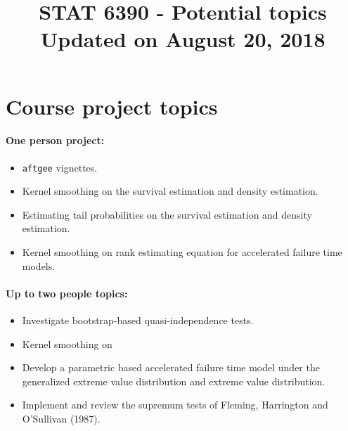 \documentclass[a4paper,10pt]{article}
\title{STAT 6390 - Potential topics\\\vspace{.5cm}
\normalsize	Updated on August 20, 2018}
\date{}
\begin{document}
\maketitle
\section*{Course project topics}
\paragraph{One person project:}
\begin{itemize}
\item \texttt{aftgee} vignettes.
\item Kernel smoothing on the survival estimation and density estimation.
\item Estimating tail probabilities on the survival estimation and density estimation.
\item Kernel smoothing on rank estimating equation for accelerated failure time models.
\end{itemize}
\paragraph{Up to two people topics:}
\begin{itemize}
\item Investigate bootstrap-based quasi-independence tests. 
\item Kernel smoothing on 
\item Develop a parametric based accelerated failure time model under the generalized extreme value distribution and extreme value distribution.
\item Implement and review the supremum tests of Fleming, Harrington and O'Sullivan (1987).
\end{itemize}
\end{document}
